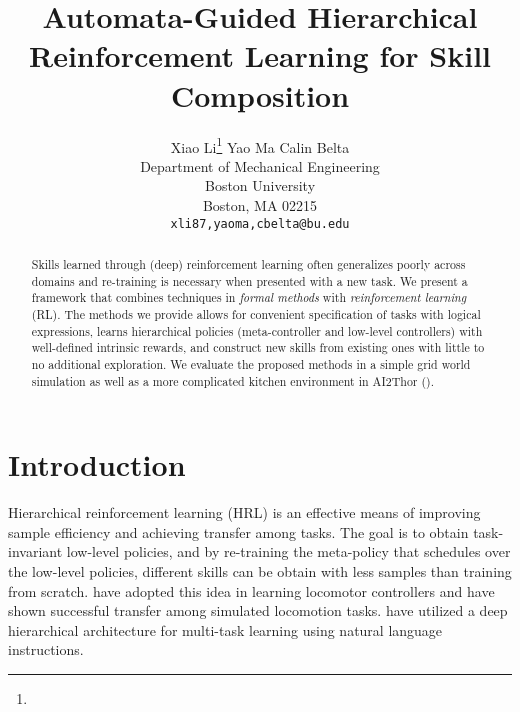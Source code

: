 \documentclass{article}
\title{Automata-Guided Hierarchical Reinforcement Learning for Skill Composition}
\author{
  Xiao Li\thanks{} \qquad \qquad Yao Ma \qquad \qquad Calin Belta \\
  Department of Mechanical Engineering\\
  Boston University\\
  Boston, MA 02215 \\
  \texttt{{xli87,yaoma,cbelta}@bu.edu} \\
  \AND
}
\begin{document}

\maketitle

\begin{abstract}
Skills learned through (deep) reinforcement learning often generalizes poorly across domains and re-training is necessary when presented with a new task. We present a framework that combines techniques in \textit{formal methods} with \textit{reinforcement learning} (RL). The methods we provide allows for convenient specification of tasks with logical expressions, learns hierarchical policies (meta-controller and low-level controllers) with well-defined intrinsic rewards, and construct new skills from existing ones with little to no additional exploration. We evaluate the proposed methods in a simple grid world simulation as well as a more complicated kitchen environment in AI2Thor (\cite{ai2thor}).
\end{abstract}


\section{Introduction}
\label{sec:intro}



Hierarchical reinforcement learning (HRL) is an effective means of improving sample efficiency and achieving transfer among tasks. The goal is to obtain task-invariant low-level policies, and by re-training the meta-policy that schedules over the low-level policies, different skills can be obtain with less samples than training from scratch. \cite{heess2016learning} have adopted this idea in learning locomotor controllers and have shown successful transfer among simulated locomotion tasks. \cite{Oh2017} have utilized a deep hierarchical architecture for multi-task learning using natural language instructions.
\end{document}
